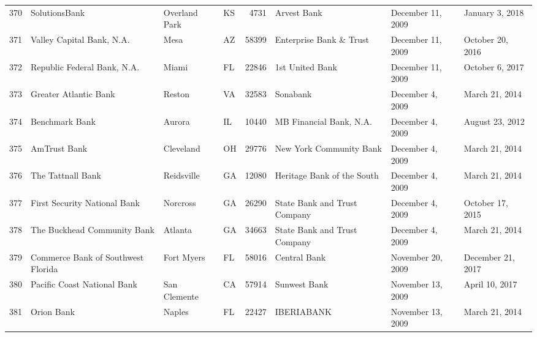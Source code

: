 \begin{tabular}{llllrlll}
370 &                                      SolutionsBank &       Overland Park &  KS &   4731 &                                        Arvest Bank &   December 11, 2009 &     January 3, 2018 \\
371 &                          Valley Capital Bank, N.A. &                Mesa &  AZ &  58399 &                            Enterprise Bank \& Trust &   December 11, 2009 &    October 20, 2016 \\
372 &                        Republic Federal Bank, N.A. &               Miami &  FL &  22846 &                                    1st United Bank &   December 11, 2009 &     October 6, 2017 \\
373 &                              Greater Atlantic Bank &              Reston &  VA &  32583 &                                           Sonabank &    December 4, 2009 &      March 21, 2014 \\
374 &                                     Benchmark Bank &              Aurora &  IL &  10440 &                            MB Financial Bank, N.A. &    December 4, 2009 &     August 23, 2012 \\
375 &                                       AmTrust Bank &           Cleveland &  OH &  29776 &                            New York Community Bank &    December 4, 2009 &      March 21, 2014 \\
376 &                                  The Tattnall Bank &          Reidsville &  GA &  12080 &                         Heritage Bank of the South &    December 4, 2009 &      March 21, 2014 \\
377 &                       First Security National Bank &            Norcross &  GA &  26290 &                       State Bank and Trust Company &    December 4, 2009 &    October 17, 2015 \\
378 &                        The Buckhead Community Bank &             Atlanta &  GA &  34663 &                       State Bank and Trust Company &    December 4, 2009 &      March 21, 2014 \\
379 &                 Commerce Bank of Southwest Florida &          Fort Myers &  FL &  58016 &                                       Central Bank &   November 20, 2009 &   December 21, 2017 \\
380 &                        Pacific Coast National Bank &        San Clemente &  CA &  57914 &                                       Sunwest Bank &   November 13, 2009 &      April 10, 2017 \\
381 &                                         Orion Bank &              Naples &  FL &  22427 &                                         IBERIABANK &   November 13, 2009 &      March 21, 2014 \\

\end{tabular}
